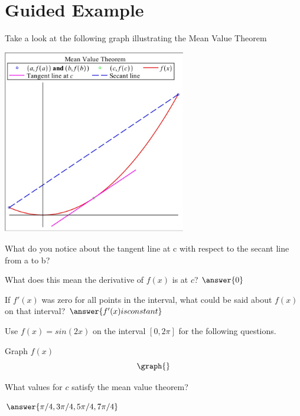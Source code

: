 \documentclass{ximera}
\begin{document}
\section{Guided Example}
Take a look at the following graph illustrating the Mean Value Theorem
\begin{image}
    \includegraphics[width=80mm]{meanvalue.jpg}
\end{image}
\begin{question}
What do you notice about the tangent line at c with respect to the secant line from a to b?
\begin{freeResponse}
\end{freeResponse}
What does this mean the derivative of $f(x)$ is at $c$?
$\answer{0}$
\end{question}
\begin{question}
If $f'(x)$ was zero for all points in the interval, what could be said about $f(x)$ on that interval?
$\answer{f'(x) is constant}$
\end{question}
\begin{question}
Use $f(x)=sin(2x)$ on the interval $[0,2\pi]$ for the following questions.

Graph $f(x)$
\[
\graph{}
\]

What values for $c$ satisfy the mean value theorem?

$\answer{\pi/4,3\pi/4,5\pi/4, 7\pi/4}$
\end{question}
\end{document}
